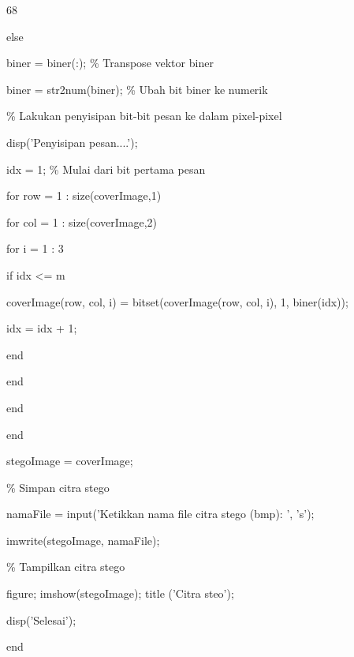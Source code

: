 \documentclass{article}
\begin{document}

68

else    

biner = biner(:);        \% Transpose vektor biner

biner = str2num(biner);  \% Ubah bit biner ke numerik


\% Lakukan penyisipan bit-bit pesan ke dalam pixel-pixel

    disp('Penyisipan pesan....');

idx = 1; \% Mulai dari bit pertama pesan

    for row = 1 : size(coverImage,1)

        for col = 1 : size(coverImage,2)

            for i = 1 : 3 

               if idx <= m

                  coverImage(row, col, i) = bitset(coverImage(row, col, i), 1, biner(idx)); 

                  idx = idx + 1;

               end    

            end        

        end

    end

    stegoImage = coverImage;

   \% Simpan citra stego

    namaFile = input('Ketikkan nama file citra stego (bmp): ', 's');

    imwrite(stegoImage, namaFile); 

    \% Tampilkan citra stego

    figure; imshow(stegoImage); title ('Citra steo');

    disp('Selesai');

end
\end{document}
